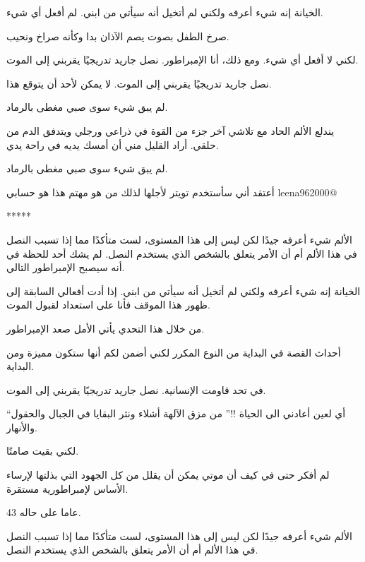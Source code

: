 الخيانة إنه شيء أعرفه ولكني لم أتخيل أنه سيأتي من ابني.
لم أفعل أي شيء.





صرخ الطفل بصوت يصم الآذان بدا وكأنه صراخ ونحيب.

لكني لا أفعل أي شيء.
ومع ذلك، أنا الإمبراطور.
نصل جاريد تدريجيًا يقربني إلى الموت.

نصل جاريد تدريجيًا يقربني إلى الموت.
لا يمكن لأحد أن يتوقع هذا.

لم يبق شيء سوى صبي مغطى بالرماد.


يندلع الألم الحاد مع تلاشي آخر جزء من القوة في ذراعي ورجلي ويتدفق الدم من حلقي.
أراد القليل مني أن أمسك يديه في راحة يدي.


لم يبق شيء سوى صبي مغطى بالرماد.








أعتقد أني سأستخدم تويتر لأجلها لذلك من هو مهتم هذا هو حسابي leena962000@

*****





الألم شيء أعرفه جيدًا لكن ليس إلى هذا المستوى، لست متأكدًا مما إذا تسبب النصل في هذا الألم أم أن الأمر يتعلق بالشخص الذي يستخدم النصل.
لم يشك أحد للحظة في أنه سيصبح الإمبراطور التالي.




الخيانة إنه شيء أعرفه ولكني لم أتخيل أنه سيأتي من ابني.
إذا أدت أفعالي السابقة إلى ظهور هذا الموقف فأنا على استعداد لقبول الموت.


من خلال هذا التحدي يأتي الأمل صعد الإمبراطور.

أحداث القصة في البداية من النوع المكرر لكني أضمن لكم أنها ستكون مميزة ومن البداية.


في تحد قاومت الإنسانية.
نصل جاريد تدريجيًا يقربني إلى الموت.







“أي لعين أعادني الى الحياة !!”
من مزق الآلهة أشلاء ونثر البقايا في الجبال والحقول والأنهار.


لكني بقيت صامتًا.

لم أفكر حتى في كيف أن موتي يمكن أن يقلل من كل الجهود التي بذلتها لإرساء الأساس لإمبراطورية مستقرة.





43 عاما على حاله.



الألم شيء أعرفه جيدًا لكن ليس إلى هذا المستوى، لست متأكدًا مما إذا تسبب النصل في هذا الألم أم أن الأمر يتعلق بالشخص الذي يستخدم النصل.

